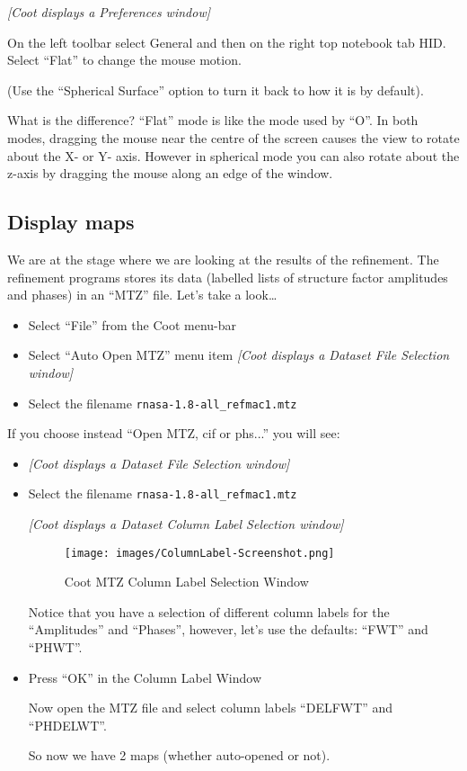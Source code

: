\documentclass{article}
\begin{document}
\textsl{  [Coot displays a Preferences window]}

On the left toolbar select \textsf{General} and then on the right top 
notebook tab \textsf{HID}. Select \textsf{``Flat''} to change the mouse motion.

(Use the \textsf{``Spherical Surface''} option to turn it back to how
it is by default).


What is the difference? ``Flat'' mode is like the mode used by ``O''.
In both modes, dragging the mouse near the centre of the screen causes
the view to rotate about the X- or Y- axis. However in spherical mode
you can also rotate about the z-axis by dragging the mouse along an
edge of the window.

\subsection{Display maps}

We are at the stage where we are looking at the results of the
refinement.  The refinement programs stores its data (labelled lists
of structure factor amplitudes and phases) in an ``MTZ'' file.  Let's
take a look\ldots


\begin{itemize}
\item Select \textsf{``File''} from the Coot menu-bar
\item Select \textsf{``Auto Open MTZ''} menu item
\textsl{  [Coot displays a Dataset File Selection window]}
\item Select the filename \texttt{rnasa-1.8-all\_refmac1.mtz}
\end{itemize}

If you choose instead ``Open MTZ, cif or phs...'' you will see:
\begin{itemize}

\item
\textsl{  [Coot displays a Dataset File Selection window]}

\item Select the filename \texttt{rnasa-1.8-all\_refmac1.mtz}

\textsl{  [Coot displays a Dataset Column Label Selection window]}


\begin{figure}[htbp]
  \begin{center}
    \leavevmode
    \texttt{[image: images/ColumnLabel-Screenshot.png]}
    \caption{Coot MTZ Column Label Selection Window}
    \label{fig:mtz_columns}
  \end{center}
\end{figure}

Notice that you have a selection of different column labels for the
``Amplitudes'' and ``Phases'', however, let's use the defaults:
``FWT'' and ``PHWT''.

\item Press \textsf{``OK''} in the Column Label Window

Now open the MTZ file and select column labels ``DELFWT'' and ``PHDELWT''.

So now we have 2 maps (whether auto-opened or not).
\end{itemize}
\end{document}
